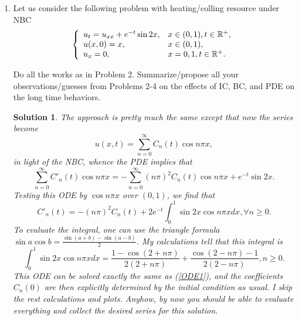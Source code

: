 \documentclass[6pt]{article}
\newtheorem{solution}{Solution}
\numberwithin{equation}{section}
\def\mathbb{\Bbb}
\begin{document}
\begin{enumerate}
\item  Let us consider the following problem with heating/colling resource under NBC
\begin{equation}\label{NBVP1}
\left\{
\begin{array}{ll}
u_t=u_{xx}+e^{-t}\sin 2x,& x\in (0,1), t\in\mathbb R^+,\\
u(x,0)=x, &x\in(0,1), \\
u_x=0, & x=0,1, t\in\mathbb R^+.
\end{array}
\right.
\end{equation}

Do all the works as in Problem 2.  Summarize/propose all your observations/guesses from Problems 2-4 on the effects of IC, BC, and PDE on the long time behaviors.
\begin{solution}
The approach is pretty much the same except that now the series become
\[u(x,t)=\sum_{n=0}^\infty C_n(t)\cos n\pi x,\]
in light of the NBC, whence the PDE implies that
\[\sum_{n=0}^\infty C'_n(t)\cos n\pi x=-\sum_{n=0}^\infty(n\pi)^2C_n(t)\cos n\pi x+e^{-t}\sin 2x.\]
Testing this ODE by $\cos n\pi x$ over $(0,1)$, we find that
\[C'_n(t)=-(n\pi)^2C_n(t)+2e^{-t}\int_0^1\sin 2x \cos n\pi xdx, \forall n\geq0.\]
To evaluate the integral, one can use the triangle formula $\sin a \cos b=\frac{\sin(a+b)-\sin(a-b)}{2}$.  My calculations tell that this integral is
\[\int_0^1\sin 2x \cos n\pi xdx=\frac{1-\cos (2+n\pi)}{2(2+n\pi)}+\frac{\cos(2-n\pi)-1}{2(2-n\pi)},n\geq0.\]
This ODE can be solved exactly the same as (\ref{ODE1}), and the coefficients $C_n(0)$ are then explicitly determined by the initial condition as usual.  I skip the rest calculations and plots.  Anyhow, by now you should be able to evaluate everything and collect the desired series for this solution.
\end{solution}


\end{enumerate}
\end{document}
